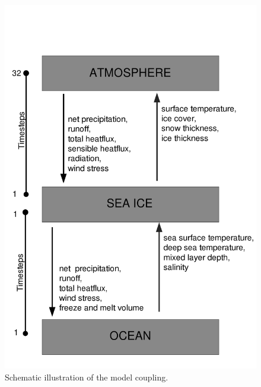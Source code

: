 \begin{figure}[p]
\vspace{-2cm}
\includegraphics[width={14cm}]{Pics/modules_icemod_couple}
\caption[]{Schematic illustration of the model coupling.}
\label{couplefig}
\end{figure}

